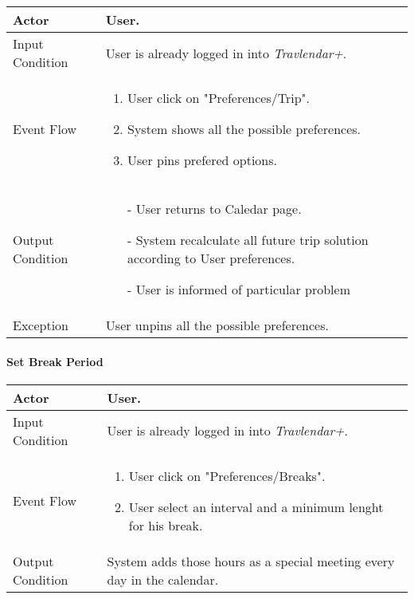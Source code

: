 		\begin{tabular}{| l | p{} | }
			\hline
			\hline
			Actor	&		User. \\
			\hline
			Input Condition		&		User is already logged in into \textit{Travlendar+}. \\
			\hline
			Event Flow		&		\begin{enumerate}
												\item User click on "Preferences/Trip".
												\item System shows all the possible preferences.
												\item User pins prefered options.
											\end{enumerate} \\
			\hline
			Output Condition		&		\begin{itemize}
													\item[-] User returns to Caledar page.
													\item[-] System recalculate all future trip solution according to User preferences.
													\item[-] User is informed of particular problem
												\end{itemize} \\
			\hline
			Exception		&		User unpins all the possible preferences. \\
			
			\hline
			\hline
		\end{tabular}
		
		

	\paragraph{Set Break Period}
	
		\begin{tabular}{| l | p{} | }
			\hline
			\hline
			Actor	&		User. \\
			\hline
			Input Condition		&		User is already logged in into \textit{Travlendar+}. \\
			\hline
			Event Flow		&		\begin{enumerate}
												\item User click on "Preferences/Breaks".
												\item User select an interval and a minimum lenght for his break.
											\end{enumerate} \\
			\hline
			Output Condition		&		System adds those hours as a special meeting every day in the calendar. \\
			\hline
			\hline
		\end{tabular}
